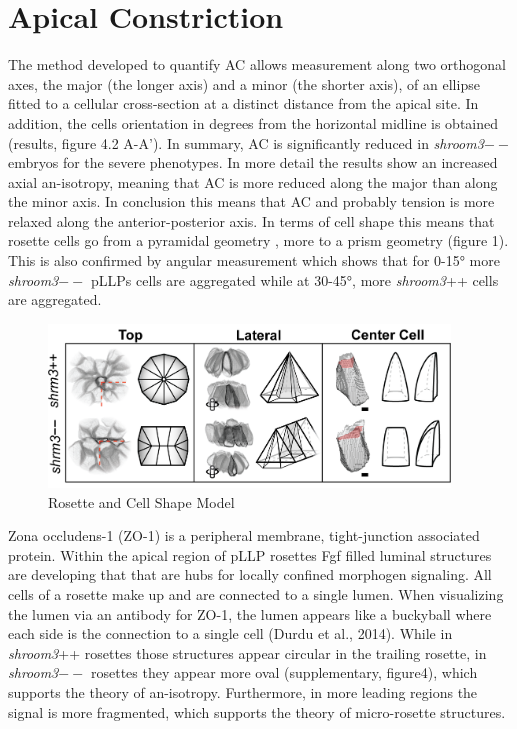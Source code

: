 \documentclass[11pt,singlespacinge,twoside]{reedthesis} %
\begin{document}
\hypertarget{apical-constriction-2}{%
\section{Apical Constriction}\label{apical-constriction-2}}

The method developed to quantify AC allows measurement along two orthogonal axes, the major (the longer axis) and a minor (the shorter axis), of an ellipse fitted to a cellular cross-section at a distinct distance from the apical site. In addition, the cells orientation in degrees from the horizontal midline is obtained (results, figure 4.2 A-A').
In summary, AC is significantly reduced in \emph{shroom3}\(--\) embryos for the severe phenotypes. In more detail the results show an increased axial an-isotropy, meaning that AC is more reduced along the major than along the minor axis. In conclusion this means that AC and probably tension is more relaxed along the anterior-posterior axis. In terms of cell shape this means that rosette cells go from a pyramidal geometry , more to a prism geometry (figure 1). This is also confirmed by angular measurement which shows that for 0-15° more \emph{shroom3}\(--\) pLLPs cells are aggregated while at 30-45°, more \emph{shroom3}++ cells are aggregated.


\begin{figure}

{\centering \includegraphics[width=0.95\textwidth]{figures/summary/cell-model} 

}

\caption[Rosette and Cell Shape Model]{Rosette and Cell Shape Model}\label{fig:sumcells}
\end{figure}
Zona occludens-1 (ZO-1) is a peripheral membrane, tight-junction associated protein. Within the apical region of pLLP rosettes Fgf filled luminal structures are developing that that are hubs for locally confined morphogen signaling. All cells of a rosette make up and are connected to a single lumen. When visualizing the lumen via an antibody for ZO-1, the lumen appears like a buckyball where each side is the connection to a single cell (Durdu et al., 2014). While in \emph{shroom3}++ rosettes those structures appear circular in the trailing rosette, in \emph{shroom3}\(--\) rosettes they appear more oval (supplementary, figure4), which supports the theory of an-isotropy. Furthermore, in more leading regions the signal is more fragmented, which supports the theory of micro-rosette structures.
\end{document}
